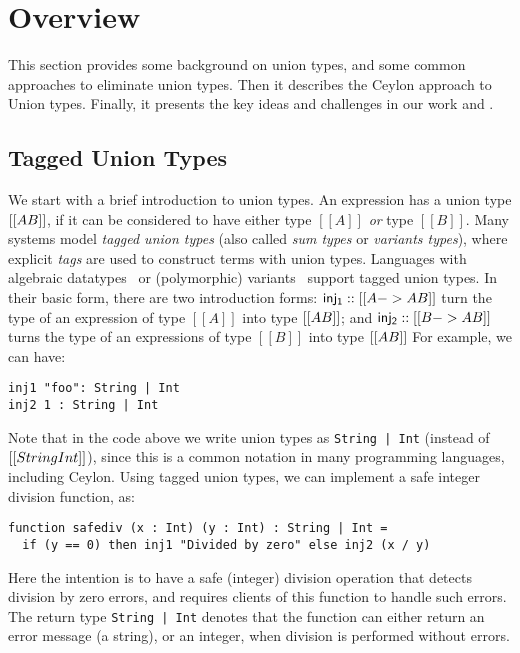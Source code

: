 \section{Overview}
\label{sec:overview}

This section provides some background on union types, and some common approaches
to eliminate union types. Then it describes the Ceylon approach to Union types.
Finally, it presents the key ideas and challenges in our work and \name.

\subsection{Tagged Union Types}


We start with a brief introduction to union types. An expression has a union
type $[[A\/B]]$, if it can be considered to have either type $[[A]]$ \textit{or}
type $[[B]]$. Many systems model \textit{tagged union types} (also called
\textit{sum types} or \textit{variants types}), where explicit \textit{tags}
are used to construct terms with union types. Languages with algebraic datatypes~\cite{hope}
or (polymorphic) variants~\cite{garrigue98} support tagged union types.
In their basic form, there are two introduction forms:
$\mathsf{inj_1} :: [[A -> A \/ B]]$ turn the type of an expression of type
$[[A]]$ into type $[[A \/ B]]$; and $\mathsf{inj_2} :: [[B -> A \/ B]]$
turns the type of an expressions of type $[[B]]$ into type $[[A \/ B]]$
For example, we can have:

\begin{lstlisting}
inj1 "foo": String | Int
inj2 1 : String | Int
\end{lstlisting}

\noindent Note that in the code above we write union types as
\lstinline{String | Int} (instead of $[[String \/ Int]]$),
since this is a common notation in many programming languages,
including Ceylon.
Using tagged union types, we can implement a safe integer
division function, as:

\begin{lstlisting}
function safediv (x : Int) (y : Int) : String | Int =
  if (y == 0) then inj1 "Divided by zero" else inj2 (x / y)
\end{lstlisting}

\noindent Here the intention is to have a safe (integer) division operation that detects
division by zero errors, and requires clients of this function to handle
such errors. The return type \lstinline{String | Int} denotes that the function
can either return an error message (a string), or an integer, when division
is performed without errors.

